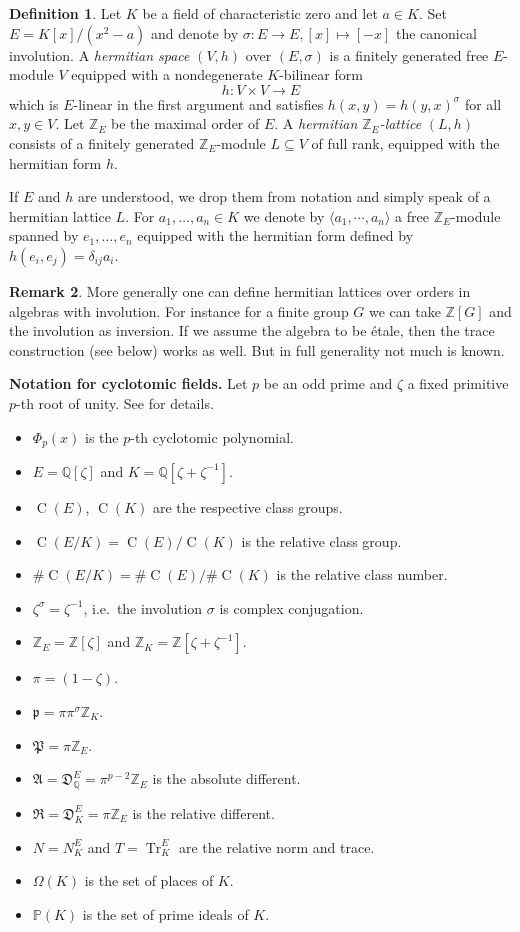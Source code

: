 \documentclass{amsart}
\theoremstyle{definition}
\newtheorem{definition}{Definition}[section]
\newtheorem{remark}[definition]{Remark}
\theoremstyle{plain}
\DeclareMathOperator{\Tr}{Tr}
\DeclareMathOperator{\Cl}{C}
\newcommand{\QQ}{\mathbb{Q}}
\newcommand{\ZZ}{\mathbb{Z}}
\begin{document}
\begin{definition}
Let $K$ be a field of characteristic zero and let $a \in K$.
Set $E = K[x]/(x^2-a)$ and denote by $\sigma\colon E \rightarrow E, [x] \mapsto [-x]$ the canonical involution.
A \emph{hermitian space} $(V,h)$ over $(E,\sigma)$ is a
finitely generated free $E$-module $V$ equipped with a nondegenerate $K$-bilinear form
\[h\colon V \times V \rightarrow E\]
which is $E$-linear in the first argument and satisfies
$h(x,y) = h(y,x)^\sigma$ for all $x,y \in V$.
Let $\ZZ_E$ be the maximal order of $E$.
A \emph{hermitian $\ZZ_E$-lattice} $(L,h)$ consists of a finitely generated $\ZZ_E$-module $L\subseteq V$ of full rank, equipped with the hermitian form $h$.
\end{definition}
If $E$ and $h$ are understood, we drop them from notation and simply speak of a hermitian lattice $L$.
For $a_1, \dots, a_n \in K$ we denote by $\langle a_1, \cdots, a_n \rangle$ a free $\ZZ_E$-module spanned by $e_1, \dots, e_n$
equipped with the hermitian form defined by $h(e_i,e_j)=\delta_{ij}a_i$.
\begin{remark}
 More generally one can define hermitian lattices over orders in algebras with involution.
 For instance for a finite group $G$ we can take $\ZZ[G]$ and the involution as inversion.
 If we assume the algebra to be \'etale, then the trace  construction (see below) works as well. But in full generality not much is known.
\end{remark}
\noindent\textbf{Notation for cyclotomic fields.}
Let $p$ be an odd prime and $\zeta$ a fixed primitive $p$-th root of unity. See \cite[Ch.\ 2]{washington:cyclotomic_fields} for details.
\begin{itemize}
 \item $\Phi_p(x)$ is the $p$-th cyclotomic polynomial.
 \item $E = \QQ[\zeta]$ and $K = \QQ[\zeta + \zeta^{-1}]$.
 \item $\Cl(E)$, $\Cl(K)$ are the respective class groups.
 \item $\Cl(E/K)=\Cl(E)/\Cl(K)$ is the relative class group.
 \item $\#\Cl(E/K)=\#\Cl(E) /\#\Cl(K)$ is the relative class number.
 \item $\zeta^{\sigma}=\zeta^{-1}$, i.e.\ the involution $\sigma$ is complex conjugation.
 \item $\ZZ_E = \ZZ[\zeta]$ and $\ZZ_K = \ZZ[\zeta + \zeta^{-1}]$.
 \item $\pi = (1-\zeta)$.
 \item $\mathfrak{p}=\pi \pi^\sigma \ZZ_K$.
 \item $\mathfrak{P}=\pi \ZZ_E$.
 \item $\mathfrak{A}= \mathfrak{D}^E_\QQ = \pi ^ {p-2} \ZZ_E$ is the absolute different.
 \item $\mathfrak{R}= \mathfrak{D}^E_K= \pi \ZZ_E$ is the relative different.
 \item $N = N^E_K$ and $T = \Tr ^E_K$ are the relative norm and trace.
 \item $\Omega(K)$ is the set of places of $K$.
 \item $\mathbb{P}(K)$ is the set of prime ideals of $K$.
\end{itemize}
\end{document}
